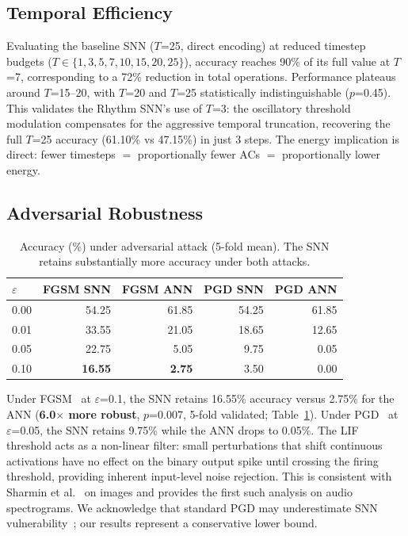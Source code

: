 \documentclass[sigconf,nonacm=false]{acmart}
\begin{document}
\subsection{Temporal Efficiency}

Evaluating the baseline SNN ($T$=25, direct encoding) at reduced timestep budgets ($T \in \{1, 3, 5, 7, 10, 15, 20, 25\}$), accuracy reaches 90\% of its full value at $T$=7, corresponding to a 72\% reduction in total operations.
Performance plateaus around $T$=15--20, with $T$=20 and $T$=25 statistically indistinguishable ($p$=0.45).
This validates the Rhythm SNN's use of $T$=3: the oscillatory threshold modulation compensates for the aggressive temporal truncation, recovering the full $T$=25 accuracy (61.10\% vs 47.15\%) in just 3 steps.
The energy implication is direct: fewer timesteps $=$ proportionally fewer ACs $=$ proportionally lower energy.

\subsection{Adversarial Robustness}

\begin{table}[t]
\caption{Accuracy (\%) under adversarial attack (5-fold mean). The SNN retains substantially more accuracy under both attacks.}
\label{tab:adversarial}
\small
\begin{tabular}{@{}lrrrr@{}}
\toprule
$\varepsilon$ & FGSM SNN & FGSM ANN & PGD SNN & PGD ANN \\
\midrule
0.00 & 54.25 & 61.85 & 54.25 & 61.85 \\
0.01 & 33.55 & 21.05 & 18.65 & 12.65 \\
0.05 & 22.75 & 5.05 & 9.75 & 0.05 \\
0.10 & \textbf{16.55} & \textbf{2.75} & 3.50 & 0.00 \\
\bottomrule
\end{tabular}
\end{table}

Under FGSM~\cite{goodfellow2015} at $\varepsilon$=0.1, the SNN retains 16.55\% accuracy versus 2.75\% for the ANN (\textbf{6.0$\times$ more robust}, $p$=0.007, 5-fold validated; Table~\ref{tab:adversarial}).
Under PGD~\cite{madry2018} at $\varepsilon$=0.05, the SNN retains 9.75\% while the ANN drops to 0.05\%.
The LIF threshold acts as a non-linear filter: small perturbations that shift continuous activations have no effect on the binary output spike until crossing the firing threshold, providing inherent input-level noise rejection.
This is consistent with Sharmin et al.~\cite{sharmin2020} on images and provides the first such analysis on audio spectrograms.
We acknowledge that standard PGD may underestimate SNN vulnerability~\cite{wang2025}; our results represent a conservative lower bound.
\end{document}
